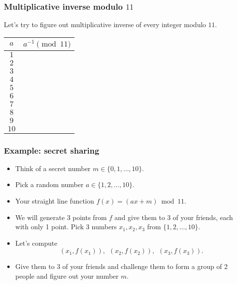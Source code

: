 \begin{frame}

  \frametitle{Multiplicative inverse modulo $11$}

  Let's try to figure out multiplicative inverse of every integer
  modulo $11$.

  \begin{tabular}{|c|c|}
    \hline
    $a$ & $a^{-1} \pmod{11}$ \\
    \hline
    $1$ & \\
    $2$ & \\
    $3$ & \\
    $4$ & \\
    $5$ & \\
    $6$ & \\
    $7$ & \\
    $8$ & \\
    $9$ & \\
    $10$ & \\
    \hline
  \end{tabular}

\end{frame}

\begin{frame}
  \frametitle{Example: secret sharing}

  \begin{itemize}
  \item Think of a secret number $m\in\{0,1,\ldots,10\}$.
  \item Pick a random number $a\in\{1,2,\ldots,10\}$.
  \item Your straight line function $f(x)=(ax+m)\bmod 11$.
  \item We will generate 3 points from $f$ and give them to 3 of your
    friends, each with only 1 point.  Pick 3 numbers $x_1,x_2,x_3$
    from $\{1,2,\ldots,10\}$.
  \item Let's compute
    \[
    (x_1,f(x_1)), \ \ 
    (x_2,f(x_2)), \ \ 
    (x_3,f(x_3)).
    \]
  \item Give them to 3 of your friends and challenge them to form a
    group of 2 people and figure out your number $m$.
  \end{itemize}
\end{frame}

